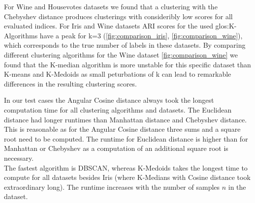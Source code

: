 


For Wine and Housevotes datasets we found that a clustering with the Chebyshev distance produces clusterings with consideribly low scores for all evaluated indices. 
For Iris and Wine datasets ARI scores for the used \Gls{glos:K-Algorithms} have a peak for k=3 (\autoref{fig:comparison_iris}, \autoref{fig:comparison_wine}), which corresponds to the true number of labels in these datasets.  
By comparing different clustering algorithms for the Wine dataset \autoref{fig:comparison_wine} we found that the K-median algorithm is more unstable for this specific dataset than K-means and K-Medoids as small peturbations of k can lead to remarkable differences in the resulting clustering scores. 

In our test cases the Angular Cosine distance always took the longest computation time for all clustering algorithms and datasets. The Euclidean distance had longer runtimes than Manhattan distance and Chebyshev distance. This is reasonable as for the Angular Cosine distance three sums and a square root need to be computed. The runtime for Euclidean distance is higher than for Manhattan or Chebyshev as a computation of an additional square root is necessary.\\
The fastest algorithm is DBSCAN, whereas K-Medoids takes the longest time to compute for all datasets besides Iris (where K-Medians with Cosine distance took extraordinary long). The runtime increases with the number of samples $n$ in the dataset. 

